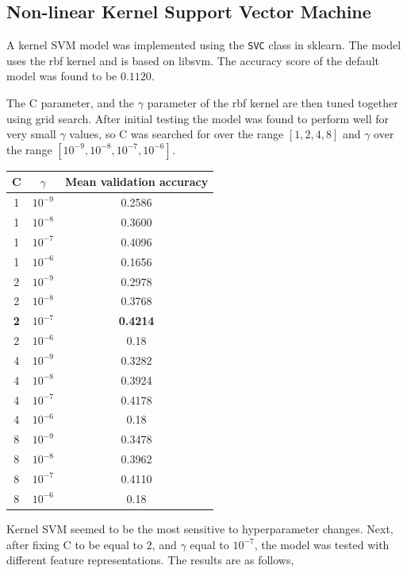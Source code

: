 \documentclass[12pt]{article}
\begin{document}
\subsection*{Non-linear Kernel Support Vector Machine}

A kernel SVM model was implemented using the \texttt{SVC} class in sklearn. The model uses the rbf kernel and is based on libsvm. The accuracy score of the default model was found to be $0.1120$.

The C parameter, and the $\gamma$ parameter of the rbf kernel are then tuned together using grid search. After initial testing the model was found to perform well for very small $\gamma$ values, so C was searched for over the range $[1,2,4,8]$ and $\gamma$ over the range $[10^{-9},10^{-8},10^{-7},10^{-6}]$.

\begin{center}
 \begin{longtable}{|c|c|c|}
  \hline
  C & $\gamma$ & Mean validation accuracy \\
  \hline
  1 & $10^{-9}$ & 0.2586\\
  1 & $10^{-8}$ & 0.3600\\
  1 & $10^{-7}$ & 0.4096\\
  1 & $10^{-6}$ & 0.1656\\
  2 & $10^{-9}$ & 0.2978\\
  2 & $10^{-8}$ & 0.3768\\
  \textbf{2} & \textbf{$10^{-7}$} & \textbf{0.4214}\\
  2 & $10^{-6}$ & 0.18\\
  4 & $10^{-9}$ & 0.3282\\
  4 & $10^{-8}$ & 0.3924\\
  4 & $10^{-7}$ & 0.4178\\
  4 & $10^{-6}$ & 0.18\\
  8 & $10^{-9}$ & 0.3478\\
  8 & $10^{-8}$ & 0.3962\\
  8 & $10^{-7}$ & 0.4110\\
  8 & $10^{-6}$ & 0.18\\
  \hline
 \end{longtable}

\end{center}

Kernel SVM seemed to be the most sensitive to hyperparameter changes. Next, after fixing C to be equal to $2$, and $\gamma$ equal to $10^{-7}$, the model was tested with different feature representations. The results are as follows,
\end{document}
